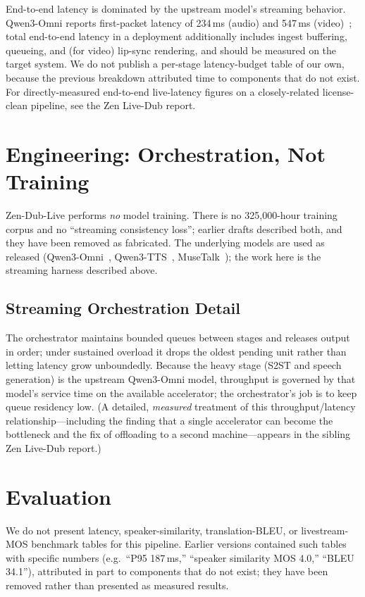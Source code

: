 \documentclass[11pt,a4paper]{article}
\begin{document}
End-to-end latency is dominated by the upstream model's streaming behavior. Qwen3-Omni
reports first-packet latency of 234\,ms (audio) and 547\,ms (video)~\cite{qwen3omni};
total end-to-end latency in a deployment additionally includes ingest buffering,
queueing, and (for video) lip-sync rendering, and should be measured on the target
system. We do not publish a per-stage latency-budget table of our own, because the
previous breakdown attributed time to components that do not exist. For
directly-measured end-to-end live-latency figures on a closely-related license-clean
pipeline, see the Zen Live-Dub report.

\section{Engineering: Orchestration, Not Training}

Zen-Dub-Live performs \emph{no} model training. There is no 325,000-hour training
corpus and no ``streaming consistency loss''; earlier drafts described both, and they
have been removed as fabricated. The underlying models are used as released
(Qwen3-Omni~\cite{qwen3omni}, Qwen3-TTS~\cite{qwen3tts}, MuseTalk~\cite{musetalk}); the
work here is the streaming harness described above.

\subsection{Streaming Orchestration Detail}

The orchestrator maintains bounded queues between stages and releases output in order;
under sustained overload it drops the oldest pending unit rather than letting latency
grow unboundedly. Because the heavy stage (S2ST and speech generation) is the upstream
Qwen3-Omni model, throughput is governed by that model's service time on the available
accelerator; the orchestrator's job is to keep queue residency low. (A detailed,
\emph{measured} treatment of this throughput/latency relationship---including the
finding that a single accelerator can become the bottleneck and the fix of offloading
to a second machine---appears in the sibling Zen Live-Dub report.)

\section{Evaluation}

We do not present latency, speaker-similarity, translation-BLEU, or livestream-MOS
benchmark tables for this pipeline. Earlier versions contained such tables with
specific numbers (e.g.\ ``P95 187\,ms,'' ``speaker similarity MOS 4.0,'' ``BLEU 34.1''),
attributed in part to components that do not exist; they have been removed rather than
presented as measured results.
\end{document}
